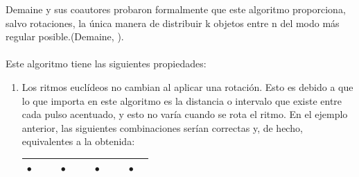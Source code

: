 \documentclass[a4paper, openright, 11pt, titlepage]{report}
\theoremstyle{definition}\newtheorem{defin}[propo]{Definition}
\theoremstyle{definition}\newtheorem{obser}[propo]{Remark}
\theoremstyle{definition}\newtheorem{ejem}[propo]{Ejemplo}
\theoremstyle{definition}\newtheorem{algoritmo}[propo]{Algoritmo}
\begin{document}
Demaine y sus coautores probaron formalmente que este algoritmo proporciona, salvo rotaciones, la única manera de distribuir k objetos entre n del modo más regular posible.(Demaine, \cite{demaine}).\\\\
Este algoritmo tiene las siguientes propiedades:
\begin{enumerate}
    \item Los ritmos euclídeos no cambian al aplicar una rotación. Esto es debido a que lo que importa en este algoritmo es la distancia o intervalo que existe entre cada pulso acentuado, y esto no varía cuando se rota el ritmo. En el ejemplo anterior, las siguientes combinaciones serían correctas y, de hecho, equivalentes a la obtenida:
    \begin{table}[H]
        \centering
        \begin{tabular}{|c|c|c|c|c|c|c|c|c|c|c|}
        \hline
            $\bullet$ & & & $\bullet$ & & & $\bullet$ & & &$\bullet$ &\\
            \hline
        \end{tabular}
        \end{table}


\end{enumerate}
\end{document}
